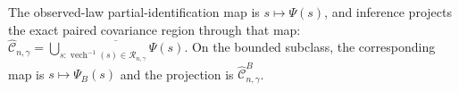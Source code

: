 The observed-law partial-identification map is \(s\mapsto\Psi(s)\), and inference projects the exact paired covariance region through that map: \(\widehat{\mathcal C}_{n,\gamma}=\overline{\bigcup_{s:\operatorname{vech}^{-1}(s)\in\mathcal R_{n,\gamma}}\Psi(s)}\). On the bounded subclass, the corresponding map is \(s\mapsto\Psi_B(s)\) and the projection is \(\widehat{\mathcal C}^{B}_{n,\gamma}\).